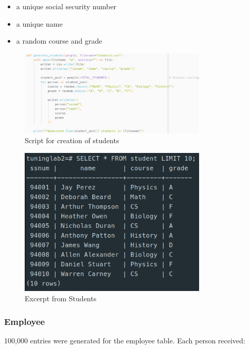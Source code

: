 \documentclass[11pt]{scrartcl}
\begin{document}
\begin{itemize}
    \item a unique social security number
    \item a unique name
    \item a random course and grade
\end{itemize}

\begin{figure}[htbp]
    \centering
    \includegraphics[width=0.8\textwidth]{Pics/StudentsScript.jpg}
    \caption{Script for creation of students}
    \label{fig:ScriptStudents}
\end{figure}

\begin{figure}[htbp]
    \centering
    \includegraphics[width=0.8\textwidth]{Pics/StudentsResult.jpg}
    \caption{Excerpt from Students}
    \label{fig:StudentsResult}
\end{figure}

\subsubsection*{Employee}

100,000 entries were generated for the employee table. Each person received:
\end{document}
